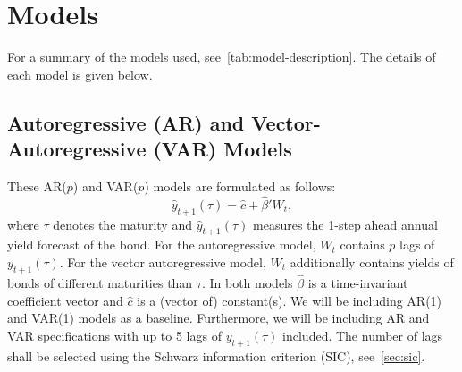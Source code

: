 \section{Models}
\label{sec:models}
For a summary of the models used, see~\cref{tab:model-description}. The details of each model is given below.
\subsection{Autoregressive (AR) and Vector-Autoregressive (VAR) Models}
\label{sec:arvar}
These AR($p$) and VAR($p$) models are formulated as follows:
\begin{equation}
	\hat{y}_{t+1}(\tau) = \hat{c} + \hat{\beta}' W_t,
\end{equation}
where $\tau$ denotes the maturity and $\hat{y}_{t+1}(\tau)$ measures the 1-step ahead annual yield forecast of the bond. 
For the autoregressive model, $W_t$ contains $p$ lags of $y_{t+1}(\tau)$. For the vector autoregressive model, $W_t$ additionally contains yields of bonds of different maturities than $\tau$. 
In both models $\hat{\beta}$ is a time-invariant coefficient vector and $\hat{c}$ is a (vector of) constant(s). 
We will be including AR(1) and VAR(1) models as a baseline. 
Furthermore, we will be including AR and VAR specifications with up to 5 lags of $y_{t+1}(\tau)$ included. 
The number of lags shall be selected using the Schwarz information criterion (SIC), see~\cref{sec:sic}.

